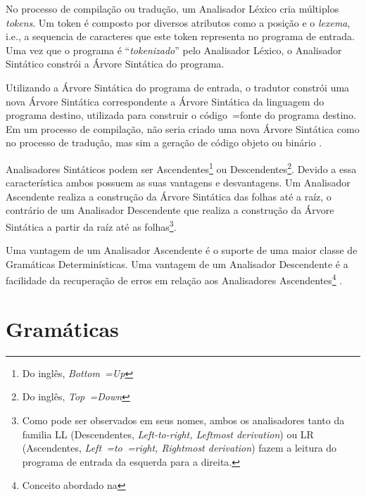 {    No processo de compilação ou
    tradução,
    um Analisador Léxico cria múltiplos \textit{tokens}.
    Um token é composto por diversos atributos como a posição e
    o \textit{lexema}, i.e.,
    a sequencia de caracteres que este token representa no programa de entrada.
    Uma vez que o programa é ``\textit{tokenizado}'' pelo Analisador Léxico,
    o Analisador Sintático constrói a Árvore Sintática do programa.

    Utilizando a Árvore Sintática do programa de entrada,
    o tradutor constrói uma nova Árvore Sintática correspondente a Árvore Sintática da linguagem do programa destino,
    utilizada para construir o código~=fonte do programa destino.
    Em um processo de compilação,
    não seria criado uma nova Árvore Sintática como no processo de tradução,
    mas sim a geração de código objeto ou
    binário \cite{ahoCompilerDragonBook}.

    Analisadores Sintáticos podem ser Ascendentes\footnote{
    Do inglês, \textit{Bottom~=Up}
    }
    ou Descendentes\footnote{
    Do inglês, \textit{Top~=Down}
    }.
    Devido a essa característica ambos possuem as suas vantagens e
    desvantagens.
    Um Analisador Ascendente realiza a construção da Árvore Sintática das folhas até a raíz,
    o contrário de um Analisador Descendente que realiza a construção da Árvore Sintática a partir da raíz até as folhas\footnote{
    Como pode ser observados em seus nomes,
    ambos os analisadores tanto da familia LL (Descendentes,
    \textit{Left-to-right, Leftmost derivation}) ou LR (Ascendentes, \textit{Left~=to~=right,
    Rightmost derivation}) fazem a leitura do programa de entrada da esquerda para a direita.
    }.

    Uma vantagem de um Analisador Ascendente é o suporte de uma maior classe de Gramáticas Determinísticas.
    Uma vantagem de um Analisador Descendente é a facilidade da recuperação de erros em relação aos Analisadores Ascendentes\footnote{
    Conceito abordado na
    }
    \cite{sippu1982,lr1ErrorRecovery,errorRecoveryForYaccParsers,repairingSyntaxErrorsInLR,larkJosefGrosch,errorsInLRParsers}.


\section{Gramáticas}

}
